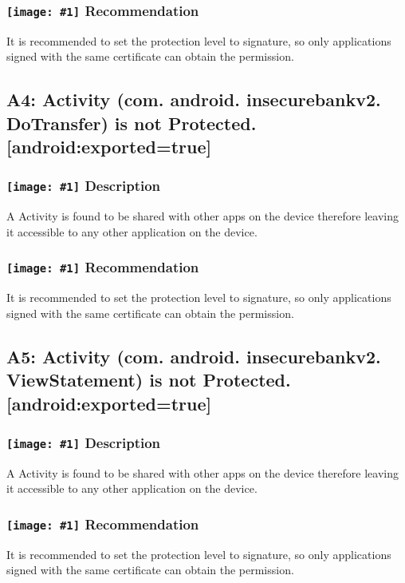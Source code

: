 \documentclass[12p]{article}
\newcommand{\icon}[1]{\texttt{[image: \#1]}}
\begin{document}
\subsubsection*{\protect\icon{/home/miki/Documents/GITHUB/AndroidPermissions/python/vulns/report_icons/basic_todo.png} Recommendation}
It is recommended to set the protection level to signature, so only applications signed with the same certificate can obtain the permission.
\subsection{A4: Activity (com. android. insecurebankv2. DoTransfer) is not Protected. [android:exported=true]}
\subsubsection*{\protect\icon{/home/miki/Documents/GITHUB/AndroidPermissions/python/vulns/report_icons/basic_sheet.png} Description}
A Activity is found to be shared with other apps on the device therefore leaving it accessible to any other application on the device.
\subsubsection*{\protect\icon{/home/miki/Documents/GITHUB/AndroidPermissions/python/vulns/report_icons/basic_todo.png} Recommendation}
It is recommended to set the protection level to signature, so only applications signed with the same certificate can obtain the permission.
\subsection{A5: Activity (com. android. insecurebankv2. ViewStatement) is not Protected. [android:exported=true]}
\subsubsection*{\protect\icon{/home/miki/Documents/GITHUB/AndroidPermissions/python/vulns/report_icons/basic_sheet.png} Description}
A Activity is found to be shared with other apps on the device therefore leaving it accessible to any other application on the device.
\subsubsection*{\protect\icon{/home/miki/Documents/GITHUB/AndroidPermissions/python/vulns/report_icons/basic_todo.png} Recommendation}
It is recommended to set the protection level to signature, so only applications signed with the same certificate can obtain the permission.
\end{document}
